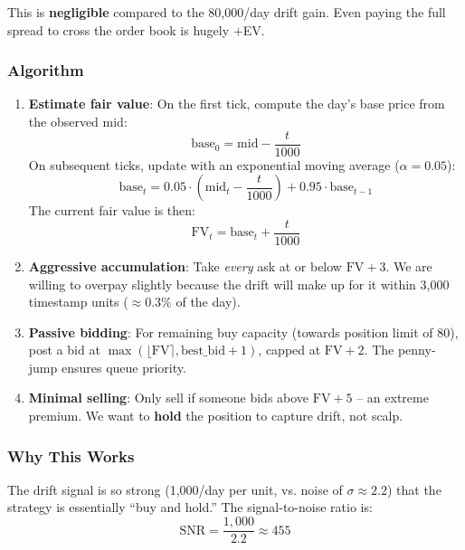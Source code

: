 \documentclass[11pt,a4paper]{article}
\begin{document}
This is \textbf{negligible} compared to the 80,000/day drift gain. Even paying the full spread to cross the order book is hugely $+$EV.

\subsubsection{Algorithm}

\begin{enumerate}
    \item \textbf{Estimate fair value}: On the first tick, compute the day's base price from the observed mid:
    \begin{equation}
        \text{base}_0 = \text{mid} - \frac{t}{1000}
    \end{equation}
    On subsequent ticks, update with an exponential moving average ($\alpha = 0.05$):
    \begin{equation}
        \text{base}_t = 0.05 \cdot \left(\text{mid}_t - \frac{t}{1000}\right) + 0.95 \cdot \text{base}_{t-1}
    \end{equation}
    The current fair value is then:
    \begin{equation}
        \text{FV}_t = \text{base}_t + \frac{t}{1000}
    \end{equation}

    \item \textbf{Aggressive accumulation}: Take \textit{every} ask at or below $\text{FV} + 3$. We are willing to overpay slightly because the drift will make up for it within 3,000 timestamp units ($\approx 0.3\%$ of the day).

    \item \textbf{Passive bidding}: For remaining buy capacity (towards position limit of 80), post a bid at $\max(\lfloor\text{FV}\rceil, \text{best\_bid} + 1)$, capped at $\text{FV} + 2$. The penny-jump ensures queue priority.

    \item \textbf{Minimal selling}: Only sell if someone bids above $\text{FV} + 5$ -- an extreme premium. We want to \textbf{hold} the position to capture drift, not scalp.
\end{enumerate}

\subsubsection{Why This Works}

The drift signal is so strong (1,000/day per unit, vs. noise of $\sigma \approx 2.2$) that the strategy is essentially ``buy and hold.'' The signal-to-noise ratio is:
\begin{equation}
    \text{SNR} = \frac{1{,}000}{2.2} \approx 455
\end{equation}
\end{document}
